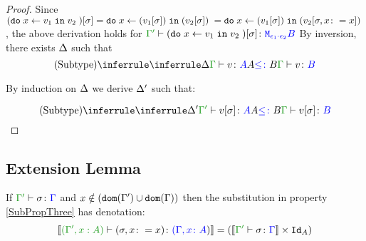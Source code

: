 \documentclass{report}
\begin{document}
\begin{framed}
\begin{proof}
            Since $(\texttt{do}\; x \leftarrow v_1 \;\texttt{in}\; v_2\;)[\sigma] = \texttt{do}\; x \leftarrow (v_1[\sigma]) \;\texttt{in}\; (v_2[\sigma])\; = \texttt{do}\; x \leftarrow (v_1[\sigma]) \;\texttt{in}\; (v_2[\sigma, x\colon= x])\;$, the above derivation holds for $\typerelation{\G'}{(\doin{x}{v_1}{v_2})\ssi}{\M{\e_1\dot\e_2}{B}}$
        \case{\vsubtype}
            By inversion, there exists $\Delta$ such that
            \begin{equation}
                \ntreeruleII{\vsubtype}{\treeruleI{\D}{\typerelation{\G}{v}{A}}}{ A\subtype B}{\typerelation{\G}{v}{B}}
            \end{equation}
        
            By induction on $\Delta$ we derive $\Delta'$ such that:
        
            \begin{equation}
                \ntreeruleII{\vsubtype}{\treeruleI{\D'}{\typerelation{\G'}{v\ssi}{A}}}{ A\subtype B}{\typerelation{\G}{v\ssi}{B}}
            \end{equation}
        
    \end{proof}
    
\end{framed}

\subsection{Extension Lemma}

\begin{lemma}
    If $\typerelation{\G'}{\si}{\G}$ and $x\notin(\texttt{dom}(\Gamma')\cup\texttt{dom}(\Gamma))$ then the substitution in property \ref{SubPropThree} has denotation:
    \begin{equation}
        \deno{\typerelation{(\G', x:A)}{(\si, x\setto x)}{(\gax})} = (\deno{\typerelation{\G'}{\si}{\G}}\times \Id{A})
    \end{equation}
\end{lemma}
\end{document}

